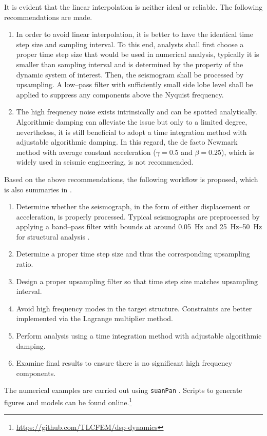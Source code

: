 It is evident that the linear interpolation is neither ideal or reliable. The following recommendations are made.
\begin{enumerate}
\item In order to avoid linear interpolation, it is better to have the identical time step size and sampling interval. To this end, analysts shall first choose a proper time step size that would be used in numerical analysis, typically it is smaller than sampling interval and is determined by the property of the dynamic system of interest. Then, the seismogram shall be processed by upsampling. A low--pass filter with sufficiently small side lobe level shall be applied to suppress any components above the Nyquist frequency.
\item The high frequency noise exists intrinsically and can be spotted analytically. Algorithmic damping can alleviate the issue but only to a limited degree, nevertheless, it is still beneficial to adopt a time integration method with adjustable algorithmic damping. In this regard, the de facto Newmark method with average constant acceleration ($\gamma=0.5$ and $\beta=0.25$), which is widely used in seismic engineering, is not recommended.
\end{enumerate}

Based on the above recommendations, the following workflow is proposed, which is also summaries in .
\begin{enumerate}
\item Determine whether the seismograph, in the form of either displacement or acceleration, is properly processed. Typical seismographs are preprocessed by applying a band--pass filter with bounds at around \SI{0.05}{\hertz} and \SIrange{25}{50}{\hertz} for structural analysis \citep[see, e.g.,][]{Houtte2017}.
\item Determine a proper time step size and thus the corresponding upsampling ratio.
\item Design a proper upsampling filter so that time step size matches upsampling interval.
\item Avoid high frequency modes in the target structure. Constraints are better implemented via the Lagrange multiplier method.
\item Perform analysis using a time integration method with adjustable algorithmic damping.
\item Examine final results to ensure there is no significant high frequency components.
\end{enumerate}

The numerical examples are carried out using \texttt{suanPan} \citep{Chang2022}. Scripts to generate figures and models can be found online.\footnote{\url{https://github.com/TLCFEM/dsp-dynamics}}